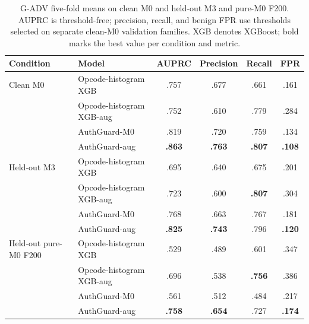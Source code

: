 \begin{table}[t]
  \centering
  \caption{G-ADV five-fold means on clean M0 and held-out M3 and pure-M0 F200. AUPRC is threshold-free; precision, recall, and benign FPR use thresholds selected on separate clean-M0 validation families. XGB denotes XGBoost; bold marks the best value per condition and metric.}
  \label{tab:gadv-results}
  \small
  \setlength{\tabcolsep}{6pt}
  \begin{tabular}{@{}llcccc@{}}
    \toprule
    Condition & Model & AUPRC & Precision & Recall & FPR \\
    \midrule
    Clean M0 & Opcode-histogram XGB & .757 & .677 & .661 & .161 \\
             & Opcode-histogram XGB-aug & .752 & .610 & .779 & .284 \\
             & AuthGuard-M0 & .819 & .720 & .759 & .134 \\
             & AuthGuard-aug & \textbf{.863} & \textbf{.763} & \textbf{.807} & \textbf{.108} \\
    \midrule
    Held-out M3 & Opcode-histogram XGB & .695 & .640 & .675 & .201 \\
                & Opcode-histogram XGB-aug & .723 & .600 & \textbf{.807} & .304 \\
                & AuthGuard-M0 & .768 & .663 & .767 & .181 \\
                & AuthGuard-aug & \textbf{.825} & \textbf{.743} & .796 & \textbf{.120} \\
    \midrule
    Held-out pure-M0 F200 & Opcode-histogram XGB & .529 & .489 & .601 & .347 \\
                          & Opcode-histogram XGB-aug & .696 & .538 & \textbf{.756} & .386 \\
                          & AuthGuard-M0 & .561 & .512 & .484 & .217 \\
                          & AuthGuard-aug & \textbf{.758} & \textbf{.654} & .727 & \textbf{.174} \\
    \bottomrule
  \end{tabular}
\end{table}
